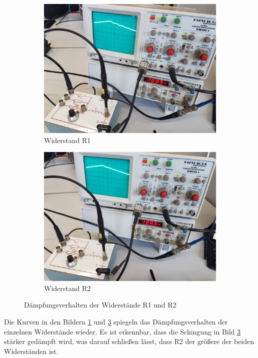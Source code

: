   \begin{figure}[H]
    \begin{subfigure}{0.495\linewidth}
     \includegraphics[width=\textwidth]{images/R1.jpg}
     \centering
     \caption{Widerstand R1}
     \label{fig:R1}
    \end{subfigure}
    \begin{subfigure}{0.495\linewidth}
     \includegraphics[width=\textwidth]{images/R2.jpg}
     \centering
     \caption{Widerstand R2}
     \label{fig:R2}
    \end{subfigure}
    \caption{Dämpfungsverhalten der Widerstände R1 und R2}
  \end{figure} 

  Die Kurven in den Bildern \ref{fig:R1} und \ref{fig:R2} spiegeln das Dämpfungsverhalten der einzelnen Widerstände wieder. 
  Es ist erkennbar, dass die Schingung in Bild \ref{fig:R2} stärker gedämpft wird, was darauf schließen lässt, dass R2 der 
  größere der beiden Widerständen ist. 

